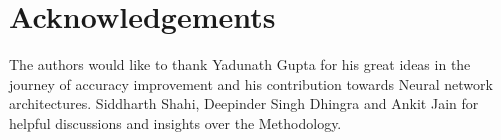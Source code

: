 \section{Acknowledgements}
The authors would like to thank Yadunath Gupta for his great ideas in the journey of accuracy improvement and
his contribution towards Neural network architectures. Siddharth Shahi, Deepinder Singh Dhingra and Ankit Jain 
for helpful discussions and insights over the Methodology.